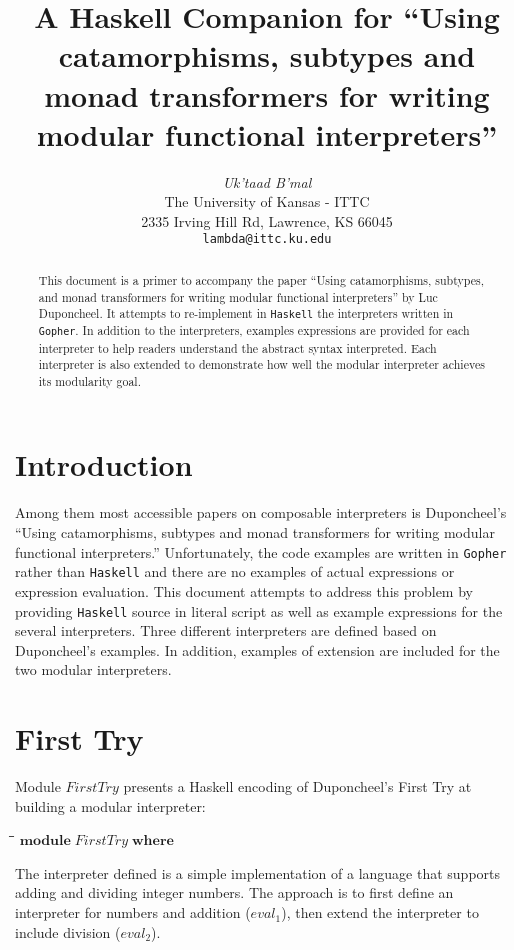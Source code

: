 \documentclass[10pt]{article}
\title{A Haskell Companion for ``Using catamorphisms, subtypes and
  monad transformers for writing modular functional interpreters''}
\author{\emph{Uk'taad B'mal} \\
  The University of Kansas - ITTC \\
  2335 Irving Hill Rd, Lawrence, KS 66045 \\
  \texttt{lambda@ittc.ku.edu}}
\newlength{\lwidth}\setlength{\lwidth}{4.5cm}
\newlength{\cwidth}\setlength{\cwidth}{8mm} %
\newcommand{\Conid}[1]{\mathit{#1}}
\newcommand{\Varid}[1]{\mathit{#1}}
\begin{document}
\maketitle

\begin{abstract}

  This document is a primer to accompany the paper ``Using
  catamorphisms, subtypes, and monad transformers for writing modular
  functional interpreters'' by Luc Duponcheel.  It attempts to
  re-implement in \texttt{Haskell} the interpreters written in
  \texttt{Gopher}.  In addition to the interpreters, examples
  expressions are provided for each interpreter to help readers
  understand the abstract syntax interpreted.  Each interpreter is
  also extended to demonstrate how well the modular interpreter
  achieves its modularity goal.
\end{abstract}

\section{Introduction}

Among them most accessible papers on composable interpreters is
Duponcheel's ``Using catamorphisms, subtypes and monad transformers
for writing modular functional interpreters.''  Unfortunately, the
code examples are written in \texttt{Gopher} rather than
\texttt{Haskell} and there are no examples of actual expressions or
expression evaluation.  This document attempts to address this problem
by providing \texttt{Haskell} source in literal script as well as
example expressions for the several interpreters.  Three different
interpreters are defined based on Duponcheel's examples.  In addition,
examples of extension are included for the two modular interpreters.

\section{First Try}

Module \ensuremath{\Conid{FirstTry}} presents a Haskell encoding of Duponcheel's First
Try at building a modular interpreter:

\begin{tabbing}
\qquad\=\hspace{\lwidth}\=\hspace{\cwidth}\=\+\kill
${\mathbf{module}\;\Conid{FirstTry}\;\mathbf{where}}$
\end{tabbing}
The interpreter defined is a simple implementation of a language that
supports adding and dividing integer numbers.  The approach is to
first define an interpreter for numbers and addition (\ensuremath{\Varid{eval}_1}), then
extend the interpreter to include division (\ensuremath{\Varid{eval}_2}).
\end{document}
